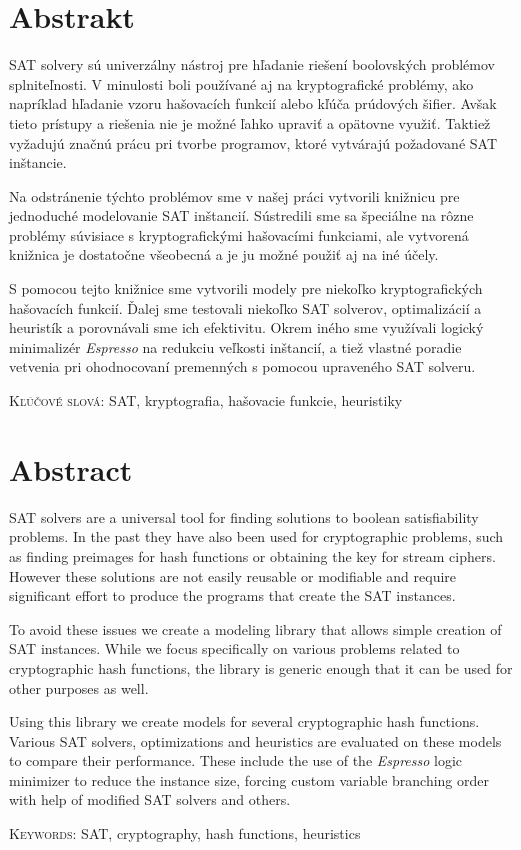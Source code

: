\chapter*{Abstrakt}
SAT solvery sú univerzálny nástroj pre hľadanie riešení boolovských problémov spl\-ni\-teľ\-no\-sti.
V minulosti boli používané aj na kryptografické problémy, ako napríklad hľadanie vzoru hašovacích funkcií alebo kľúča prúdových šifier.
Avšak tieto prístupy a riešenia nie je možné ľahko upraviť a opätovne využiť.
Taktiež vyžadujú značnú prácu pri tvorbe programov, ktoré vytvárajú požadované SAT inštancie.

Na odstránenie týchto problémov sme v našej práci vytvorili knižnicu pre jednoduché modelovanie SAT inštancií.
Sústredili sme sa špeciálne na rôzne problémy súvisiace s kryptografickými hašovacími funkciami, ale vytvorená knižnica je dostatočne všeobecná a je ju možné použiť aj na iné účely.

S pomocou tejto knižnice sme vytvorili modely pre niekoľko kryptografických hašovacích funkcií.
Ďalej sme testovali niekoľko SAT solverov, optimalizácií a heuristík a porovnávali sme ich efektivitu.
Okrem iného sme využívali logický minimalizér \emph{Espresso} na redukciu veľkosti inštancií, a tiež vlastné poradie vetvenia pri ohodnocovaní premenných s pomocou upraveného SAT solveru.

\vspace{2cm}
\noindent\textsc{Kľúčové slová:} SAT, kryptografia, hašovacie funkcie, heuristiky

\chapter*{Abstract}
SAT solvers are a universal tool for finding solutions to boolean satisfiability problems.
In the past they have also been used for cryptographic problems, such as finding preimages for hash functions or obtaining the key for stream ciphers.
However these solutions are not easily reusable or modifiable and require significant effort to produce the programs that create the SAT instances.

To avoid these issues we create a modeling library that allows simple creation of SAT instances.
While we focus specifically on various problems related to cryptographic hash functions, the library is generic enough that it can be used for other purposes as well.

Using this library we create models for several cryptographic hash functions.
Various SAT solvers, optimizations and heuristics are evaluated on these models to compare their performance.
These include the use of the \emph{Espresso} logic minimizer to reduce the instance size, forcing custom variable branching order with help of modified SAT solvers and others.

\vspace{2cm}
\noindent\textsc{Keywords:} SAT, cryptography, hash functions, heuristics
